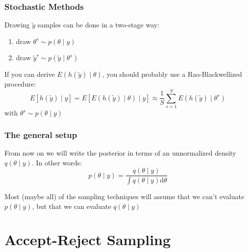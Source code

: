 \documentclass{beamer}
\begin{document}
\begin{frame}
\frametitle{Stochastic Methods}

Drawing $\tilde{y}$ samples can be done in a two-stage way:
\begin{enumerate}
\item draw $\theta^s \sim p(\theta \mid y)$
\item draw $\tilde{y}^s \sim p(\tilde{y} \mid \theta^s)$
\end{enumerate}
\pause

If you can derive $E\left( h(\tilde{y}) \mid \theta \right)$, you should probably use a Rao-Blackwellized procedure:
\[
E[h(\tilde{y}) \mid y] = E[E\left( h(\tilde{y}) \mid \theta \right) \mid y] \approx \frac{1}{S} \sum_{s=1}^S E\left( h(\tilde{y}) \mid \theta^s \right)
\]
with $\theta^s \sim p(\theta \mid y)$


\end{frame}


\begin{frame}[fragile]
\frametitle{The general setup}

From now on we will write the posterior in terms of an unnormalized density $q(\theta \mid y)$. In other words:
\[
p(\theta \mid y) = \frac{q(\theta \mid y)}{ \int q(\theta \mid y) \text{d}\theta}
\]

Most (maybe all) of the sampling techniques will assume that we can't evaluate $p(\theta \mid y)$, but that we can evaluate $q(\theta \mid y)$

\end{frame}


\section{Accept-Reject Sampling}
\end{document}
